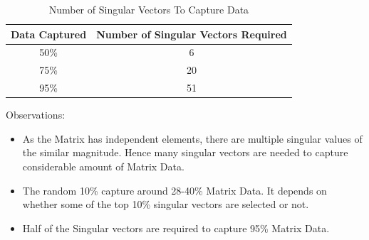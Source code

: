 \documentclass[a4 paper]{article}
\begin{document}
\begin{table}[h!]
\centering
 \begin{tabular}{|c|c|} 
 \hline
Data Captured & Number of Singular Vectors Required \\ [0.5ex] 
\hline
50\% &  6\\
75\% &  20\\
95\% &  51\\
\hline
\end{tabular}
\caption{Number of Singular Vectors To Capture Data}
\end{table}
\newpage
{} Observations:
\begin{itemize}
  \item As the Matrix has independent elements, there are multiple singular values of the similar magnitude. Hence many singular vectors are needed to capture considerable amount of Matrix Data. 
  \item The random 10\%  capture around 28-40\% Matrix Data. It depends on whether some of the top 10\% singular vectors are selected or not. 
  \item Half of the Singular vectors are required to capture 95\% Matrix Data.
\end{itemize}




\newpage
{}
\end{document}
